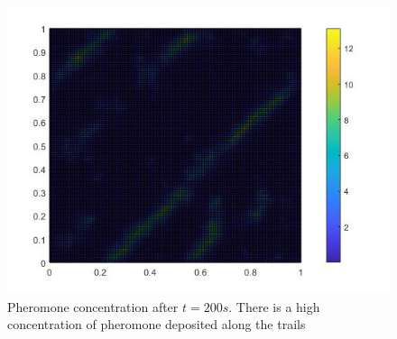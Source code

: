 \begin{figure}
    \centering
    \includegraphics[scale = 0.35]{figures/conc_matrix.jpg}
    \caption{Pheromone concentration after $t = 200s$. There is a high concentration of pheromone deposited along the trails}
    \label{fig:concmatrix}
\end{figure}




